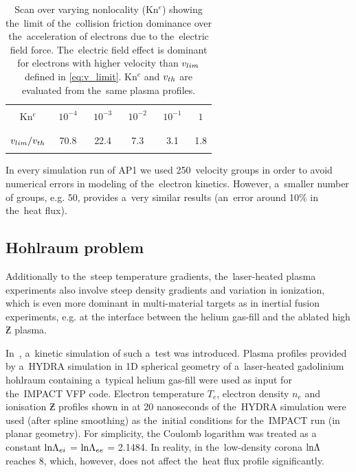 \begin{table}
\begin{center}
  \begin{tabular}{c|ccccc}
    \hline\hline\\
    Kn$^e$ & $\,\,10^{-4}\,\,$ & $\,\,10^{-3}\,\,$ & $\,\,10^{-2}\,\,$ & $\,\,10^{-1}\,\,$ & $\,\,1\,\,$ \\\\
    \hline\\
    $v_{lim} / v_{th}$ & 70.8 & 22.4 & 7.3 & 3.1 & 1.8\\\\
    \hline\hline
  \end{tabular}
  \caption{
  Scan over varying nonlocality (Kn$^e$) showing the~limit of 
  the~collision friction dominance over the~acceleration of electrons 
  due to the~electric field force. The~electric field effect is dominant
  for electrons with higher velocity than $v_{lim}$ defined in 
  \eqref{eq:v_limit}. Kn$^e$ and $v_{th}$ are evaluated from the~same 
  plasma profiles.
  }
\label{tab:vlim}
\end{center}
\end{table}

In every simulation run of AP1 we used 250~velocity groups in order to avoid
numerical errors in modeling of the~electron kinetics. However, a~smaller 
number of groups, e.g. 50, provides a~very similar results 
(an~error around 10$\%$ in the~heat flux).

\subsection{Hohlraum problem}
Additionally to the~steep temperature gradients, the~laser-heated plasma 
experiments also involve steep density gradients and variation in ionization,
which is even more dominant in multi-material targets as in inertial
fusion experiments, e.g. at the interface between the helium gas-fill and 
the ablated high $\Zbar$ plasma.

In~\cite{Brodrick_PoP2017}, a~kinetic simulation of such a~test was introduced.
Plasma profiles provided by a~HYDRA simulation in 1D spherical
geometry of a~laser-heated gadolinium hohlraum containing a~typical helium 
gas-fill were used as input for the~IMPACT \cite{Kingham_JCP2004} VFP code. 
Electron temperature $T_e$, electron density $n_e$ and ionisation $\Zbar$ 
profiles shown in  at 20 nanoseconds of 
the~HYDRA simulation were used (after spline smoothing) as 
the~initial conditions for the~IMPACT run (in planar geometry). 
For simplicity, the Coulomb logarithm was treated as a
constant $\text{ln}\Lambda_{ei}$ = $\text{ln}\Lambda_{ee}$ = 2.1484. In reality, in the~low-density 
corona $\text{ln}\Lambda$ reaches 8, which, however, does not affect the~heat flux profile 
significantly. 

